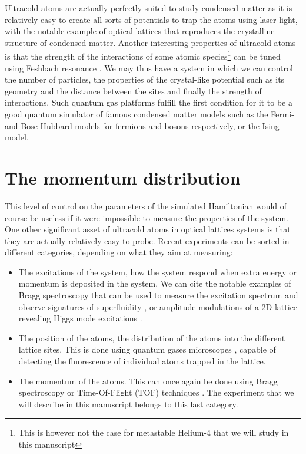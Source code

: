 Ultracold atoms are actually perfectly suited to study condensed matter as it is relatively easy to create all sorts of potentials to trap the atoms using laser light, with the notable example of optical lattices \cite{bloch2005ultracold} that reproduces the crystalline structure of condensed matter. Another interesting properties of ultracold atoms is that the strength of the interactions of some atomic species\footnote{This is however not the case for metastable Helium-4 that we will study in this manuscript} can be tuned using Feshbach resonance \cite{chin2010feshbach,feshbach1958unified}. We may thus have a system in which we can control the number of particles, the properties of the crystal-like potential such as its geometry and the distance between the sites and finally the strength of interactions. Such quantum gas platforms fulfill the first condition for it to be a good quantum simulator of famous condensed matter models such as the Fermi- and Bose-Hubbard models for fermions and bosons respectively, or the Ising model. 

\section*{The momentum distribution}

This level of control on the parameters of the simulated Hamiltonian would of course be useless if it were impossible to measure the properties of the system. One other significant asset of ultracold atoms in optical lattices systems is that they are actually relatively easy to probe. Recent experiments can be sorted in different categories, depending on what they aim at measuring:

\begin{itemize}
 \item The excitations of the system, \ie how the system respond when extra energy or momentum is deposited in the system. We can cite the notable examples of Bragg spectroscopy that can be used to measure the excitation spectrum and observe signatures of superfluidity \cite{sobirey2021observation,steinhauer2002excitation}, or amplitude modulations of a 2D lattice revealing Higgs mode excitations \cite{endres2012higgs}. 
 \item The position of the atoms, \ie the distribution of the atoms into the different lattice sites. This is done using quantum gases microscopes \cite{bakr2009quantum,cheuk2015quantum,sherson2010single}, capable of detecting the fluorescence of individual atoms trapped in the lattice.
 \item The momentum of the atoms. This can once again be done using Bragg spectroscopy or Time-Of-Flight (TOF) techniques \cite{greiner2002quantum,spielman2008condensate,xu2006}. The experiment that we will describe in this manuscript belongs to this last category.
\end{itemize}


